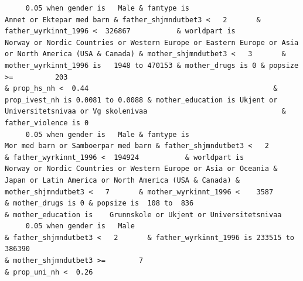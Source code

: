 \documentclass[
  letterpaper,
  DIV=11,
  numbers=noendperiod]{scrreprt}
\begin{document}
\begin{verbatim}
     0.05 when gender is   Male & famtype is                                        Annet or Ektepar med barn & father_shjmndutbet3 <   2       & father_wyrkinnt_1996 <  326867           & worldpart is                              Norway or Nordic Countries or Western Europe or Eastern Europe or Asia or North America (USA & Canada) & mother_shjmndutbet3 <   3       & mother_wyrkinnt_1996 is   1948 to 470153 & mother_drugs is 0 & popsize >=          203                                                                    & prop_hs_nh <  0.44                                            & prop_ivest_nh is 0.0081 to 0.0088 & mother_education is Ukjent or Universitetsnivaa or Vg skolenivaa                                & father_violence is 0                                                                                                               
     0.05 when gender is   Male & famtype is                              Mor med barn or Samboerpar med barn & father_shjmndutbet3 <   2       & father_wyrkinnt_1996 <  194924           & worldpart is            Norway or Nordic Countries or Western Europe or Asia or Oceania & Japan or Latin America or North America (USA & Canada) & mother_shjmndutbet3 <   7       & mother_wyrkinnt_1996 <    3587           & mother_drugs is 0 & popsize is  108 to  836                                                                                                                                                                        & mother_education is    Grunnskole or Ukjent or Universitetsnivaa                                                                                                                                                                     
     0.05 when gender is   Male                                                                               & father_shjmndutbet3 <   2       & father_wyrkinnt_1996 is 233515 to 386390                                                                                                                                                    & mother_shjmndutbet3 >=        7                                                                                          & prop_uni_nh <  0.26                                                                                                                                                                                                                                                                                                                                                                                         

\end{verbatim}
\end{document}
